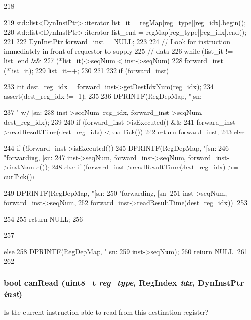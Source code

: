 \begin{DoxyCode}
218 {
219     std::list<DynInstPtr>::iterator list_it = regMap[reg_type][reg_idx].begin();
220     std::list<DynInstPtr>::iterator list_end = regMap[reg_type][reg_idx].end();
221 
222     DynInstPtr forward_inst = NULL;
223 
224     // Look for instruction immediately in front of requestor to supply
225     // data
226     while (list_it != list_end &&
227            (*list_it)->seqNum < inst->seqNum) {
228         forward_inst = (*list_it);
229         list_it++;
230     }
231 
232     if (forward_inst) {
233         int dest_reg_idx = forward_inst->getDestIdxNum(reg_idx);
234         assert(dest_reg_idx != -1);
235 
236         DPRINTF(RegDepMap, "[sn:%
      
237                 " w/ [sn:%
238                 inst->seqNum, reg_idx, forward_inst->seqNum, dest_reg_idx);
239 
240         if (forward_inst->isExecuted() &&
241             forward_inst->readResultTime(dest_reg_idx) < curTick()) {
242             return forward_inst;
243         } else {
244             if (!forward_inst->isExecuted()) {
245                 DPRINTF(RegDepMap, "[sn:%
246                         "forwarding, [sn:%
247                         inst->seqNum, forward_inst->seqNum, forward_inst->instNam
      e());
248             } else if (forward_inst->readResultTime(dest_reg_idx) >= curTick()) {
      
249                 DPRINTF(RegDepMap, "[sn:%
250                         "forwarding, [sn:%
251                         inst->seqNum, forward_inst->seqNum,
252                         forward_inst->readResultTime(dest_reg_idx));
253             }
254 
255             return NULL;
256         }
257     } else {
258         DPRINTF(RegDepMap, "[sn:%
259                 inst->seqNum);
260         return NULL;
261     }
262 }
\end{DoxyCode}
\hypertarget{classRegDepMap_ae8b9c354b5aeebf986113ee06b6284bd}{
\subsubsection[{canRead}]{\setlength{\rightskip}{0pt plus 5cm}bool canRead (uint8\_\-t {\em reg\_\-type}, \/  {\bf RegIndex} {\em idx}, \/  {\bf DynInstPtr} {\em inst})}}
\label{classRegDepMap_ae8b9c354b5aeebf986113ee06b6284bd}
Is the current instruction able to read from this destination register? 


